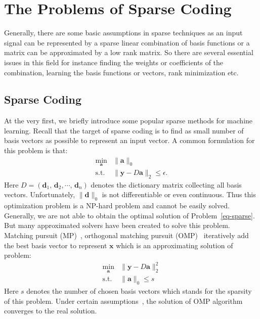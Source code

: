 \section{The Problems of Sparse Coding}
Generally, there are some basic assumptions in sparse techniques as an input signal can be represented by a sparse linear combination of basis functions or a matrix can be approximated by a low rank matrix. 
So there are several essential issues in this field for instance finding the weights or coefficients of the combination, learning the basis functions or vectors, rank minimization etc.
\subsection{Sparse Coding}
At the very first, we briefly introduce some popular sparse methods for machine learning.
Recall that the target of sparse coding is to find as small number of basis vectors as possible to represent an input vector.
A common formulation for this problem is that:
\begin{equation}
\begin{array}{cl}
\min_{\mathbf{a}} & \|\mathbf{a}\|_0\\
\mathrm{s.t.} & \|\mathbf{y}-D\mathbf{a}\|_2 \leq \epsilon.
\end{array}
\label{eq-sparse}
\end{equation}
Here $D=(\mathbf{d}_1,\,\mathbf{d}_2,\cdots ,\,\mathbf{d}_n)$ denotes the dictionary matrix collecting all basis vectors.
Unfortunately, $\|\mathbf{d}\|_0$ is not differentiable or even continuous.
Thus this optimization problem is a NP-hard problem and cannot be easily solved.
Generally, we are not able to obtain the optimal solution of Problem~\ref{eq-sparse}.
But many approximated solvers have been created to solve this problem.
Matching pursuit (MP)~\cite{mallat1993matching}, orthogonal matching pursuit (OMP)~\cite{pati1993orthogonal,tropp2007signal} iteratively add the best basis vector to represent $\mathbf{x}$ which is an approximating solution of problem:
\begin{equation}
\begin{array}{cl}
\min_{\mathbf{a}} & \|\mathbf{y}-D\mathbf{a}\|_2^2 \\
\mathrm{s.t.} & \|\mathbf{a}\|_0 \leq s
\end{array}
\end{equation}
Here $s$ denotes the number of chosen basis vectors which stands for the sparsity of this problem.
Under certain assumptions~\cite{pati1993orthogonal}, the solution of OMP algorithm converges to the real solution.

